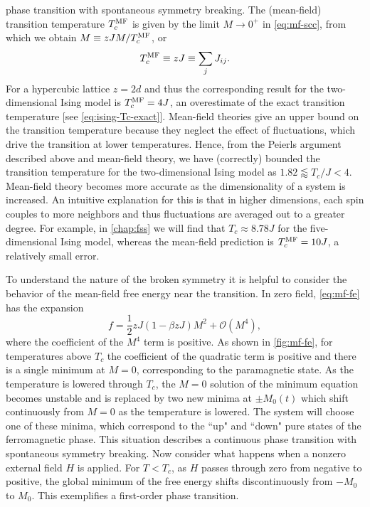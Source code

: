 phase transition with spontaneous symmetry breaking. The (mean-field)
transition temperature $T_c^{\mathrm{MF}}$ is given by the limit $M \to 0^+$ in
\cref{eq:mf-scc}, from which we obtain $M \equiv z J M / T_c^{\mathrm{MF}}$, or
\begin{equation}
  T_c^{\mathrm{MF}} \equiv z J \equiv \sum_j J_{ij}.
\end{equation}
For a hypercubic lattice $z = 2 d$ and thus the corresponding result for the
two-dimensional Ising model is $T_c^{\mathrm{MF}}=4J$, an overestimate of the exact
transition temperature [see \cref{eq:ising-Tc-exact}]. Mean-field theories give
an upper bound on the transition temperature because they neglect the effect of
fluctuations, which drive the transition at lower temperatures. Hence, from the
Peierls argument described above and mean-field theory, we have (correctly)
bounded the transition temperature for the two-dimensional Ising model as $1.82
\lessapprox T_c/J < 4$. Mean-field theory becomes more accurate as the
dimensionality of a system is increased. An intuitive explanation for this is
that in higher dimensions, each spin couples to more neighbors and thus
fluctuations are averaged out to a greater degree. For example, in
\cref{chap:fss} we will find that $T_c \approx 8.78 J$ for the five-dimensional
Ising model, whereas the mean-field prediction is $T_c^{\mathrm{MF}} = 10 J$, a relatively
small error.

To understand the nature of the broken symmetry it is helpful to consider the
behavior of the mean-field free energy near the transition. In zero field,
\cref{eq:mf-fe} has the expansion
\begin{equation}
  f = \frac{1}{2} z J (1 - \beta z J) M^2 + \mathcal{O}(M^4),
  \label{eq:mf-fe-trunc}
\end{equation}
where the coefficient of the $M^4$ term is positive. As shown in
\cref{fig:mf-fe}, for temperatures above $T_c$ the coefficient of the quadratic
term is positive and there is a single minimum at $M=0$, corresponding to the
paramagnetic state. As the temperature is lowered through $T_c$, the $M=0$
solution of the minimum equation becomes unstable and is replaced by two new
minima at $\pm M_0(t)$ which shift continuously from $M=0$ as the temperature
is lowered. The system will choose one of these minima, which correspond to the
``up" and ``down" pure states of the ferromagnetic phase. This situation
describes a continuous phase transition with spontaneous symmetry breaking. Now
consider what happens when a nonzero external field $H$ is applied. For
$T<T_c$, as $H$ passes through zero from negative to positive, the global
minimum of the free energy shifts discontinuously from $-M_0$ to $M_0$. This
exemplifies a first-order phase transition.

